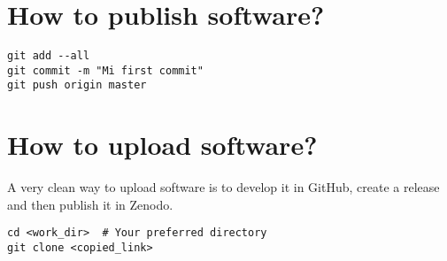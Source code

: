 \section{How to publish software?}

\begin{lstlisting}[style=shell]
git add --all
git commit -m "Mi first commit"
git push origin master
\end{lstlisting}


\section{How to upload software?}

A very clean way to upload software is to develop it in \textsf{GitHub}, create a release and then publish it in Zenodo.


\begin{lstlisting}[style=shell]
cd <work_dir>  # Your preferred directory
git clone <copied_link>
\end{lstlisting}
